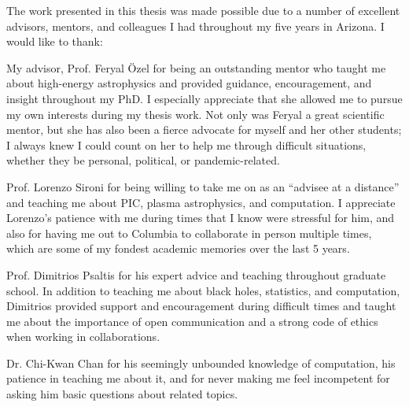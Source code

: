 The work presented in this thesis was made possible due to a number of excellent advisors, mentors, and colleagues I had throughout my five years in Arizona.  I would like to thank:

My advisor, Prof. Feryal \"Ozel for being an outstanding mentor who taught me about high-energy astrophysics and provided guidance, encouragement, and insight throughout my PhD.  I especially appreciate that she allowed me to pursue my own interests during my thesis work.  Not only was Feryal a great scientific mentor, but she has also been a fierce advocate for myself and her other students; I always knew I could count on her to help me through difficult situations, whether they be personal, political, or pandemic-related.  

Prof. Lorenzo Sironi for being willing to take me on as an ``advisee at a distance'' and teaching me about PIC, plasma astrophysics, and computation.  I appreciate Lorenzo's patience with me during times that I know were stressful for him, and also for having me out to Columbia to collaborate in person multiple times, which are some of my fondest academic memories over the last 5 years.

Prof. Dimitrios Psaltis for his expert advice and teaching throughout graduate school.  In addition to teaching me about black holes, statistics, and computation, Dimitrios provided support and encouragement during difficult times and taught me about the importance of open communication and a strong code of ethics when working in collaborations. 

Dr. Chi-Kwan Chan for his seemingly unbounded knowledge of computation, his patience in teaching me about it, and for never making me feel incompetent for asking him basic questions about related topics.
